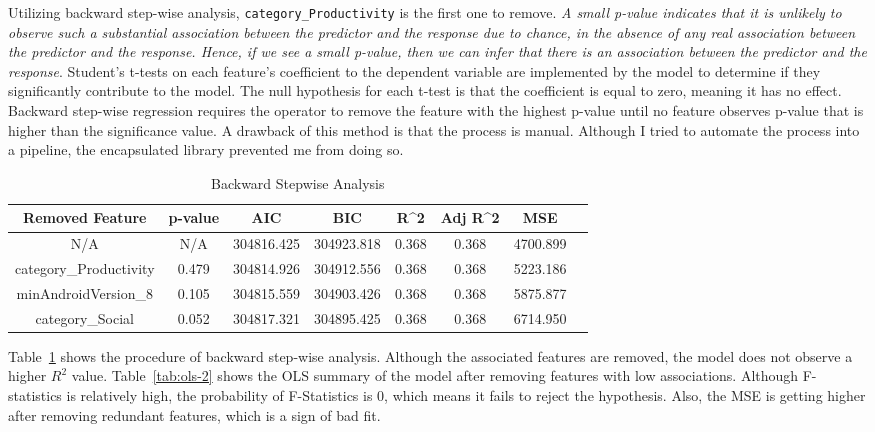 Utilizing backward step-wise analysis, \texttt{category\_Productivity} is the first one to remove.\textit{ A small p-value indicates that it is unlikely to observe such a substantial association between the predictor and the response due to chance, in the absence of any real association between the predictor and the response. Hence, if we see a small p-value, then we can infer that there is an association between the predictor and the response}\cite{james2023introduction}. Student's t-tests on each feature's coefficient to the dependent variable are implemented by the model to determine if they significantly contribute to the model. The null hypothesis for each t-test is that the coefficient is equal to zero, meaning it has no effect. Backward step-wise regression requires the operator to remove the feature with the highest p-value until no feature observes p-value that is higher than the significance value. A drawback of this method is that the process is manual. Although I tried to automate the process into a pipeline, the encapsulated library prevented me from doing so.

\begin{center}
    \begin{table}[]
        \centering
        \scriptsize
            \begin{tabular}{cccccccc}
                \hline
                 Removed Feature & p-value & AIC & BIC & R^2 & Adj R^2 & MSE \\
                \hline
                N/A & N/A & 304816.425 & 304923.818 & 0.368 & 0.368 & 4700.899 \\
                category\_Productivity & 0.479 & 304814.926 & 304912.556 & 0.368 & 0.368 & 5223.186 \\
                minAndroidVersion\_8 & 0.105 & 304815.559 & 304903.426 & 0.368 & 0.368 & 5875.877 \\
                category\_Social & 0.052 & 304817.321 & 304895.425 & 0.368 & 0.368 & 6714.950 \\
                \hline
            \end{tabular}
        \caption{Backward Stepwise Analysis}
        \label{tab:backwise}
    \end{table}
\end{center}

Table~\ref{tab:backwise} shows the procedure of backward step-wise analysis. Although the associated features are removed, the model does not observe a higher $R^2$ value. Table~\ref{tab:ols-2} shows the OLS summary of the model after removing features with low associations. Although F-statistics is relatively high, the probability of F-Statistics is 0, which means it fails to reject the hypothesis. Also, the MSE is getting higher after removing redundant features, which is a sign of bad fit.


